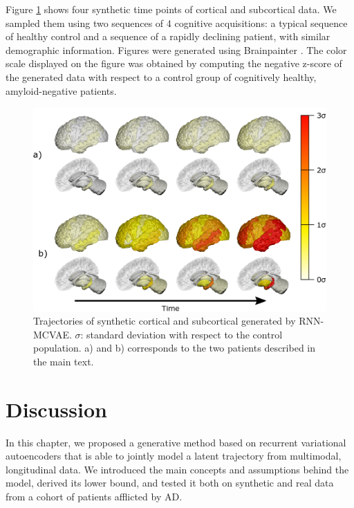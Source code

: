 Figure \ref{fig:rnn:qualitative} shows four synthetic time points of cortical and subcortical data. We sampled them using two sequences of 4 cognitive acquisitions: a typical sequence of healthy control and a sequence of a rapidly declining patient, with similar demographic information. Figures were generated using Brainpainter \cite{Marinescu2019a}. The color scale displayed on the figure was obtained by computing the negative z-score of the generated data with respect to a control group of cognitively healthy, amyloid-negative \cite{Shaw2009} patients. \\

\begin{figure}[!htbp]
  \centering
  \includegraphics[width=1.0\textwidth]{figures/rnnvae/brainpainter.png}
  \caption[Trajectories of synthetic cortical and subcortical generated by RNN-MCVAE.]{Trajectories of synthetic cortical and subcortical generated by RNN-MCVAE. $\sigma$: standard deviation with respect to the control population. a) and b) corresponds to the two patients described in the main text.}
 \label{fig:rnn:qualitative}
\end{figure}

\section{Discussion}
\label{rnn:discussion}

In this chapter, we proposed a generative method based on recurrent variational autoencoders that is able to jointly model a latent trajectory from multimodal, longitudinal data. We introduced the main concepts and assumptions behind the model, derived its lower bound, and tested it both on synthetic and real data from a cohort of patients afflicted by AD. \\


